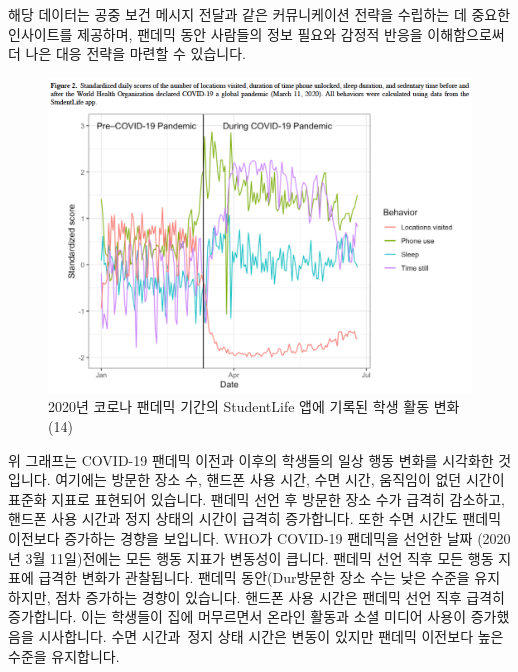 \documentclass[
  letterpaper,
]{book}
\begin{document}
해당 데이터는 공중 보건 메시지 전달과 같은 커뮤니케이션 전략을 수립하는
데 중요한 인사이트를 제공하며, 팬데믹 동안 사람들의 정보 필요와 감정적
반응을 이해함으로써 더 나은 대응 전략을 마련할 수 있습니다.

\begin{figure}[H]

{\centering \includegraphics{img/fig11.png}

}

\caption{2020년 코로나 팬데믹 기간의 StudentLife 앱에 기록된 학생 활동
변화 (14)}

\end{figure}%

위 그래프는 COVID-19 팬데믹 이전과 이후의 학생들의 일상 행동 변화를
시각화한 것입니다. 여기에는 방문한 장소 수, 핸드폰 사용 시간, 수면 시간,
움직임이 없던 시간이 표준화 지표로 표현되어 있습니다. 팬데믹 선언 후
방문한 장소 수가 급격히 감소하고, 핸드폰 사용 시간과 정지 상태의 시간이
급격히 증가합니다. 또한 수면 시간도 팬데믹 이전보다 증가하는 경향을
보입니다. WHO가 COVID-19 팬데믹을 선언한 날짜 (2020년 3월 11일)전에는
모든 행동 지표가 변동성이 큽니다. 팬데믹 선언 직후 모든 행동 지표에
급격한 변화가 관찰됩니다. 팬데믹 동안(Dur방문한 장소 수는 낮은 수준을
유지하지만, 점차 증가하는 경향이 있습니다. 핸드폰 사용 시간은 팬데믹
선언 직후 급격히 증가합니다. 이는 학생들이 집에 머무르면서 온라인 활동과
소셜 미디어 사용이 증가했음을 시사합니다. 수면 시간과~정지 상태 시간은
변동이 있지만 팬데믹 이전보다 높은 수준을 유지합니다.
\end{document}
